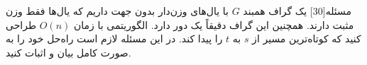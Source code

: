 %
%
%
%
%

‌مسئله[30]
یک گراف همبند $G$ با یال‌های وزن‌دار بدون جهت داریم که یال‌ها فقط وزن مثبت دارند. همچنین این گراف دقیقاً یک دور دارد. الگوریتمی با زمان $O(n)$ طراحی کنید که کوتاه‌ترین مسیر از $s$ به $t$ را پیدا کند. در این مسئله لازم است راه‌حل خود را به صورت کامل بیان و اثبات کنید.



